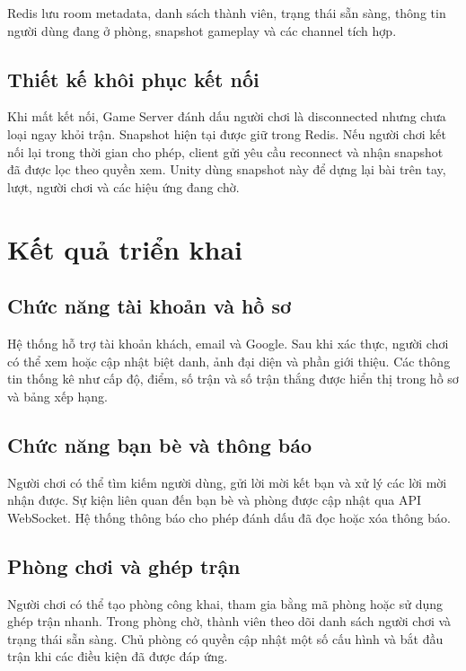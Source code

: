 \documentclass[a4paper]{report}
\begin{document}
Redis lưu room metadata, danh sách thành viên, trạng thái sẵn sàng, thông tin
người dùng đang ở phòng, snapshot gameplay và các channel tích hợp.

\section{Thiết kế khôi phục kết nối}

Khi mất kết nối, Game Server đánh dấu người chơi là disconnected nhưng chưa loại
ngay khỏi trận. Snapshot hiện tại được giữ trong Redis. Nếu người chơi kết nối
lại trong thời gian cho phép, client gửi yêu cầu reconnect và nhận snapshot đã
được lọc theo quyền xem. Unity dùng snapshot này để dựng lại bài trên tay, lượt,
người chơi và các hiệu ứng đang chờ.

\chapter{Kết quả triển khai}

\section{Chức năng tài khoản và hồ sơ}

Hệ thống hỗ trợ tài khoản khách, email và Google. Sau khi xác thực, người chơi có
thể xem hoặc cập nhật biệt danh, ảnh đại diện và phần giới thiệu. Các thông tin
thống kê như cấp độ, điểm, số trận và số trận thắng được hiển thị trong hồ sơ và
bảng xếp hạng.

\section{Chức năng bạn bè và thông báo}

Người chơi có thể tìm kiếm người dùng, gửi lời mời kết bạn và xử lý các lời mời
nhận được. Sự kiện liên quan đến bạn bè và phòng được cập nhật qua API WebSocket.
Hệ thống thông báo cho phép đánh dấu đã đọc hoặc xóa thông báo.

\section{Phòng chơi và ghép trận}

Người chơi có thể tạo phòng công khai, tham gia bằng mã phòng hoặc sử dụng ghép
trận nhanh. Trong phòng chờ, thành viên theo dõi danh sách người chơi và trạng
thái sẵn sàng. Chủ phòng có quyền cập nhật một số cấu hình và bắt đầu trận khi
các điều kiện đã được đáp ứng.
\end{document}
